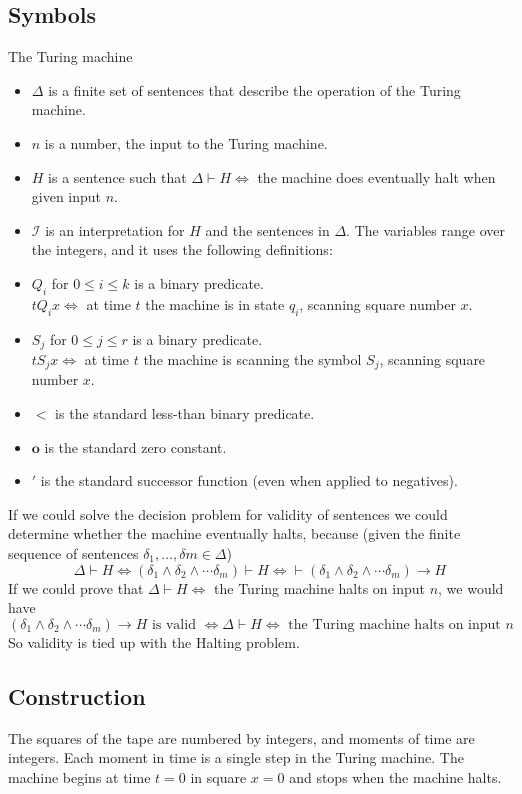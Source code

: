 \subsection{Symbols}
\newcommand{\z}{\mathbf{o}}

The Turing machine 

\begin{itemize}
\item $\Delta$ is a finite set of sentences that describe the operation of the Turing machine.
\item $n$ is a number, the input to the Turing machine.
\item $H$ is a sentence such that $\Delta\vdash H\iff$ the machine does eventually halt when given input $n$.
\item $\mathscr{I}$ is an interpretation for $H$ and the sentences in $\Delta$. The variables range over the integers, and it uses the following definitions:
\item $Q_i$ for $0 \le i \le k$ is a binary predicate.\\
$t Q_i x \iff $ at time $t$ the machine is in state $q_i$, scanning square number $x$.
\item $S_j$ for $0\le j\le r$ is a binary predicate.\\
$t S_j x \iff $ at time $t$ the machine is scanning the symbol $S_j$, scanning square number $x$.
\item $<$ is the standard less-than binary predicate.
\item $\z$ is the standard zero constant.
\item $'$ is the standard successor function (even when applied to negatives).
\end{itemize}

If we could solve the decision problem for validity of sentences we could determine whether the machine eventually halts, because (given the finite sequence of sentences $\delta_1,\dots,\delta m\in \Delta$)
\[\Delta\vdash H\iff (\delta_1\land \delta_2\land \cdots \delta_m)\vdash H \iff \vdash (\delta_1 \land  \delta_2 \land  \cdots\delta_m) \rightarrow H\]
If we could prove that $\Delta\vdash H \iff $ the Turing machine halts on input $n$, we would have
\[(\delta_1 \land  \delta_2 \land  \cdots\delta_m) \rightarrow H\text{ is valid }\iff \Delta\vdash H \iff \text{ the Turing machine halts on input }n\]
So validity is tied up with the Halting problem.

\subsection{Construction}
The squares of the tape are numbered by integers, and moments of time are integers. Each moment in time is a single step in the Turing machine. The machine begins at time $t=0$ in square $x=0$ and stops when the machine halts. 

